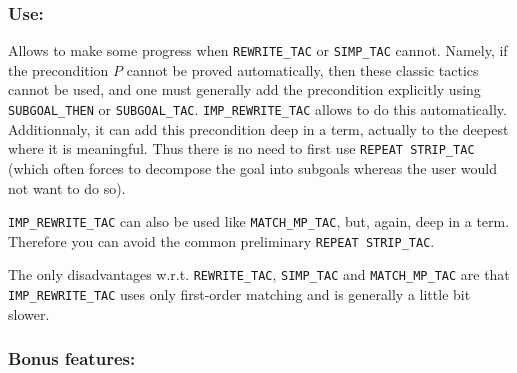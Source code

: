 \documentclass{llncs}
\newcommand*\IMPREWRITETAC{\texttt{IMP\_REWRITE\_TAC}\xspace}
\newcommand*\REWRITETAC{\texttt{REWRITE\_TAC}\xspace}
\newcommand*\SIMPTAC{\texttt{SIMP\_TAC}\xspace}
\newcommand*\MATCHMPTAC{\texttt{MATCH\_MP\_TAC}\xspace}
\begin{document}
    \subsubsection{Use:}
    Allows to make some progress when \REWRITETAC or \SIMPTAC cannot.
    Namely, if the precondition $P$ cannot be proved automatically, then these classic tactics cannot be used,
    and one must generally add the precondition explicitly using \texttt{SUBGOAL\_THEN} or \texttt{SUBGOAL\_TAC}.
    \IMPREWRITETAC allows to do this automatically.
    Additionnaly, it can add this precondition deep in a term, actually to the deepest where it is meaningful.
    Thus there is no need to first use \texttt{REPEAT STRIP\_TAC} (which often forces to decompose the goal
    into subgoals whereas the user would not want to do so).

    \IMPREWRITETAC can also be used like \MATCHMPTAC, but, again, deep in a term.
    Therefore you can avoid the common preliminary \texttt{REPEAT STRIP\_TAC}.

    The only disadvantages w.r.t. \REWRITETAC, \SIMPTAC and \MATCHMPTAC
    are that \IMPREWRITETAC uses only first-order matching and is generally a little bit slower.

		\subsubsection{Bonus features:}
\end{document}
